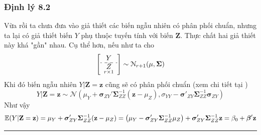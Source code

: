 
\begin{frame}
\frametitle{Định lý 8.2}
    Vừa rồi ta chưa đưa vào giả thiết các biến ngẫu nhiên có phân phối chuẩn, nhưng ta lại có giả thiết biến $Y$ phụ thuộc tuyến tính với biến $\mathbf{Z}$.
Thực chất hai giả thiết này khá "gần" nhau. Cụ thể hơn, nếu như ta cho
\[
\left[\begin{array}{c}
Y \\
\hdashline \underset{r \times 1}{\bar{Z}}
\end{array}\right] \sim \mathcal{N}_{r+1}(\mu, \boldsymbol{\Sigma})
\]
Khi đó biến ngẫu nhiên $Y|\mathbf{Z} = \mathbf{z}$ cũng sẽ có phân phối chuẩn (xem chi tiết tại \cite{5})
\[
Y|\mathbf{Z}=\mathbf{z} \sim \mathcal{N} \left( \mu_Y + \boldsymbol{\sigma}_{ZY}' \boldsymbol{\Sigma}_{ZZ}^{-1} (\mathbf{z} - \mu_{Z}), \sigma_{YY} - \boldsymbol{\sigma}'_{ZY} \boldsymbol{\Sigma}_{ZZ}^{-1} \boldsymbol{\sigma}_{ZY} \right)
\]
Như vậy
\[
\mathbb{E}(Y|\mathbf{Z} = \mathbf{z}) = \mu_Y + \boldsymbol{\sigma}_{ZY}' \boldsymbol{\Sigma}_{ZZ}^{-1} (\mathbf{z}-\mu_{Z}) = \left( \mu_Y - \boldsymbol{\sigma}'_{ZY} \boldsymbol{\Sigma}_{ZZ}^{-1} \mu_{Z} \right) + \boldsymbol{\sigma}'_{ZY} \boldsymbol{\Sigma}_{ZZ}^{-1} \mathbf{z} = \beta_0 + \boldsymbol{\beta}' \mathbf{z}
\]

\noindent\rule{\textwidth}{1pt}
\end{frame}


